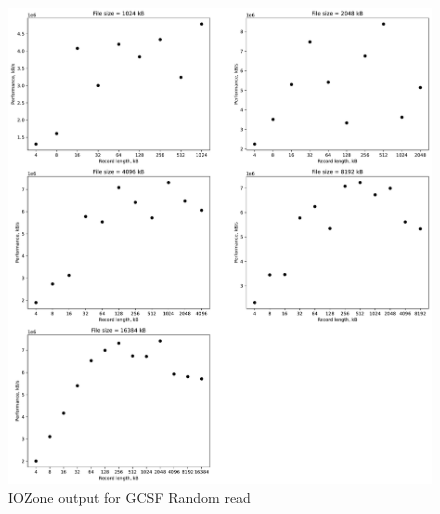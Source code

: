 \begin{figure}[!htb]
	\label{fig:app_benchgcsfs_rnd_read}
	\begin{center}
		\includegraphics[width=1.0\textwidth]{figures/benchmarking/gcsf/Random read.pdf}
	\end{center}
	\caption{IOZone output for \gls{GCSF} Random read}
\end{figure}

